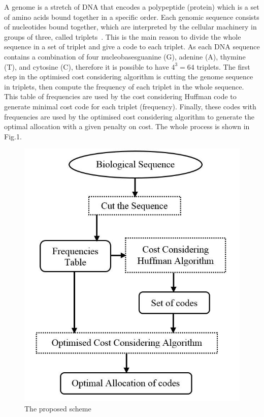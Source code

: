 \documentclass[twocolumn,12pt,a4paper]{article}
\begin{document}
A genome is a stretch of DNA that encodes  a polypeptide (protein) which is a set of amino acids bound together in a specific order. Each genomic sequence consists of nucleotides bound together, which are interpreted by the cellular machinery in groups of three, called triplets~\citep{Harvey00}. This is the main reason to divide the whole sequence in a set of triplet and give a code to each triplet. As each DNA sequence contains a combination of four nucleobases\textemdash guanine (G), adenine (A), thymine (T), and cytosine (C), therefore it is possible to have $4^3=64$ triplets.  The first step in the optimised cost considering algorithm is cutting the genome sequence in triplets, then compute the frequency of each triplet in the whole sequence. This table of frequencies are used by the cost considering Huffman code to generate minimal cost code for each triplet (frequency). Finally, these codes with frequencies are used by the optimised cost considering algorithm to generate the optimal allocation with a given  penalty on cost. The whole process is shown in Fig.1.%

\begin{figure}[t]
\begin{center}
\includegraphics[scale=0.4]{Images/Drawing3_1.jpg}
\caption{The proposed scheme}
\end{center}
\label{Fig1}
\end{figure}
\end{document}
